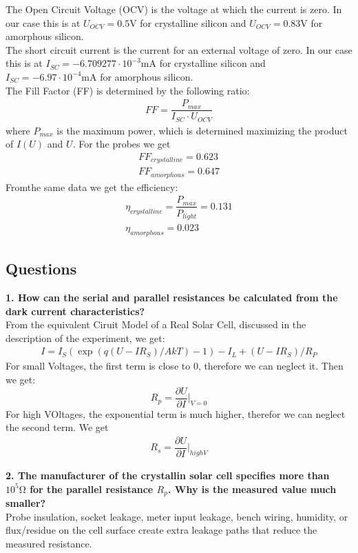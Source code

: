 The Open Circuit Voltage (OCV) is the voltage at which the current is zero. In our case this is at 
$U_{OCV} = 0.5 \si{\volt}$ for crystalline silicon and $U_{OCV} = 0.83 \si{\volt}$ for amorphous silicon.\\
The short circuit current is the current for an external voltage of zero. In our case this is at 
$I_{SC} = -6.709277 \cdotp 10^{-3} \si{\milli\ampere}$ for crystalline silicon and $I_{SC} = -6.97 \cdot 10^{-4} \si{\milli\ampere}$ for amorphous silicon.\\
The Fill Factor (FF) is determined by the following ratio:
\begin{align}
  FF = \dfrac{P_{max}}{I_{SC} \cdot U_{OCV}}
\end{align}
where $P_{max}$ is the maximum power, which is determined maximizing the product of $I(U)$ and $U$. For the probes
we get 
\begin{align}
  FF_{crystalline} = 0.623\\
  FF_{amorphous} = 0.647
\end{align}
Fromthe same data we get the efficiency:
\begin{align}
  \eta_{crystalline} = \dfrac{P_{max}}{P_{light}} = 0.131\\
  \eta_{amorphous} = 0.023
\end{align}

\subsection{Questions}
\textbf{1. How can the serial and parallel resistances be calculated from the dark current characteristics?}\\
From the equivalent Ciruit Model of a Real Solar Cell, discussed in the description of the experiment, we get:
\begin{align*}
  I = I_S (\exp (q(U-IR_S)/AkT) - 1) -I_L + (U -IR_S)/R_P
\end{align*}
For small Voltages, the first term is close to $0$, therefore we can neglect it. Then we get:
\begin{equation*}
  R_p = {\dfrac{\partial U}{\partial I}}|_{V = 0}
\end{equation*}
For high VOltages, the exponential term is much higher, therefor we can neglect the second term. We get
\begin{align*}
  R_s = {\dfrac{\partial U}{\partial I}}|_{high V}
\end{align*}

\textbf{2. The manufacturer of the crystallin solar cell specifies more than $10^{5} \si{\ohm}$ for the parallel 
resistance $R_p$. Why is the measured value much smaller?}\\
Probe insulation, socket leakage, meter input leakage, bench wiring, humidity, or flux/residue on the cell surface 
create extra leakage paths that reduce the measured resistance.

